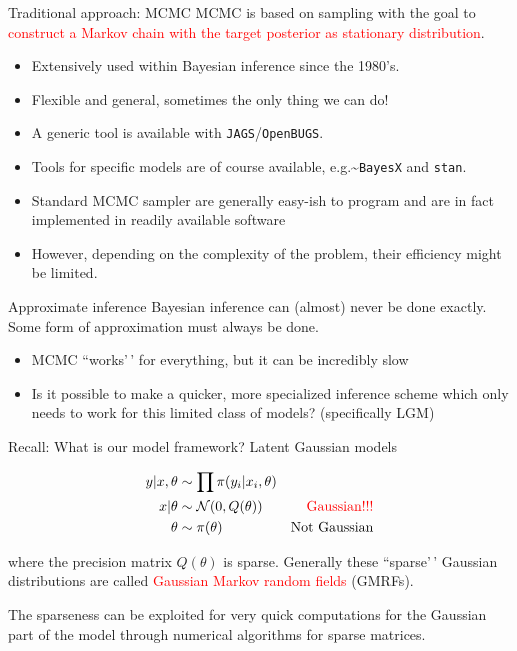 \documentclass[
  ignorenonframetext,
]{beamer}
\providecommand{\tightlist}{%
  \setlength{\itemsep}{0pt}\setlength{\parskip}{0pt}}
\begin{document}
\begin{frame}{Traditional approach: MCMC}
\protect\hypertarget{traditional-approach-mcmc}{}
MCMC is based on sampling with the goal to
\textcolor{red}{construct a Markov chain with the target posterior as stationary distribution}.

\begin{itemize}
\tightlist
\item
  Extensively used within Bayesian inference since the 1980's.
\item
  Flexible and general, sometimes the only thing we can do!
\item
  A generic tool is available with \texttt{JAGS}/\texttt{OpenBUGS}.
\item
  Tools for specific models are of course available,
  e.g.\textasciitilde{}\texttt{BayesX} and \texttt{stan}.
\item
  Standard MCMC sampler are generally easy-ish to program and are in
  fact implemented in readily available software
\item
  However, depending on the complexity of the problem, their efficiency
  might be limited.
\end{itemize}
\end{frame}

\begin{frame}{Approximate inference}
\protect\hypertarget{approximate-inference}{}
Bayesian inference can (almost) never be done exactly. Some form of
approximation must always be done.

\begin{itemize}
\tightlist
\item
  MCMC ``works'\,' for everything, but it can be incredibly slow
\item
  Is it possible to make a quicker, more specialized inference scheme
  which only needs to work for this limited class of models?
  (specifically LGM)
\end{itemize}
\end{frame}

\begin{frame}{Recall: What is our model framework?}
\protect\hypertarget{recall-what-is-our-model-framework}{}
Latent Gaussian models

\[
\begin{aligned}
y| x, \theta & \sim \prod  \pi(y_i|x_i,\theta) & \\
x|\theta & \sim\mathcal{N}(0,Q(\theta)) & \text{\textcolor{red}{Gaussian!!!}}\\
\theta & \sim\pi(\theta)& \text{Not Gaussian}
\end{aligned}
\]

where the precision matrix \(Q(\theta)\) is sparse. Generally these
``sparse'\,' Gaussian distributions are called
\textcolor{red}{Gaussian Markov random fields} (GMRFs).

The sparseness can be exploited for very quick computations for the
Gaussian part of the model through numerical algorithms for sparse
matrices.
\end{frame}
\end{document}
